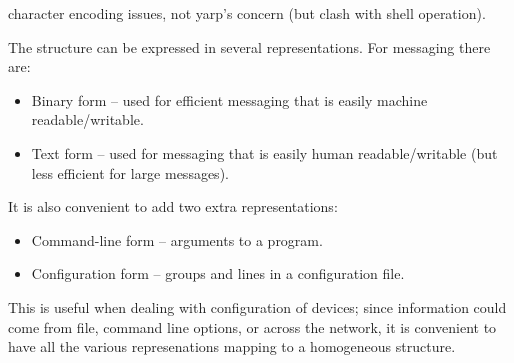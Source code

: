 character encoding issues, not yarp's concern (but clash with shell 
operation).


The structure
can be expressed in several representations.  For messaging there are:

\begin{itemize}

\item Binary form -- used for efficient messaging that is
easily machine readable/writable.

\item Text form -- used for messaging that is easily human
readable/writable (but less efficient for large messages).

\end{itemize}

It is also convenient to add two extra representations:

\begin{itemize}

\item Command-line form -- arguments to a program.

\item Configuration form -- groups and lines in a configuration file.

\end{itemize}

This is useful when dealing with configuration of devices; since
information could come from file, command line options, or across the
network, it is convenient to have all the various represenations
mapping to a homogeneous structure.









